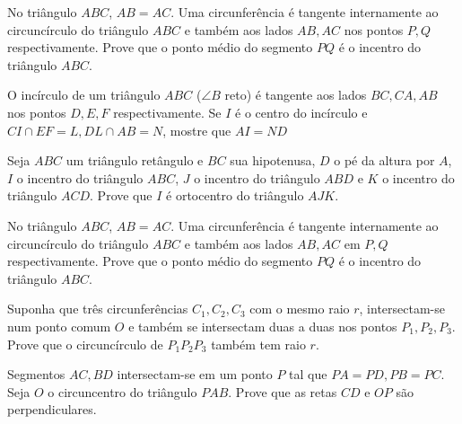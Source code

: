 \begin{questao}
  No triângulo $ABC$, $AB=AC$. Uma circunferência é
  tangente internamente ao circuncírculo do triângulo $ABC$ e também
  aos lados $AB,AC$ nos pontos $P,Q$ respectivamente. Prove que o
  ponto médio do segmento $PQ$ é o incentro do triângulo $ABC$.
\end{questao}

\begin{questao} O incírculo de um triângulo $ABC$ ($\angle B$ reto) é
  tangente aos lados $BC,CA,AB$ nos pontos $D,E,F$
  respectivamente. Se $I$ é o centro do incírculo e $CI \cap EF =
  L, DL \cap AB=N $, mostre que $AI=ND$
\end{questao}

\begin{questao} Seja $ABC$ um triângulo retângulo e $BC$ sua
  hipotenusa, $D$ o pé da altura por $A$, $I$ o incentro do
  triângulo $ABC$, $J$ o incentro do triângulo $ABD$ e $K$ o
  incentro do triângulo $ACD$. Prove que $I$ é ortocentro do
  triângulo $AJK$.
\end{questao}

\begin{questao} No triângulo $ABC$, $AB=AC$. Uma circunferência é
  tangente internamente ao circuncírculo do triângulo $ABC$ e também
  aos lados $AB,AC$ em $P,Q$ respectivamente. Prove que o ponto
  médio do segmento $PQ$ é o incentro do triângulo $ABC$.
\end{questao}

\begin{questao} Suponha que três circunferências $C_1,C_2,C_3$ com o
  mesmo raio $r$, intersectam-se num ponto comum $O$ e também se
  intersectam duas a duas nos pontos $P_1,P_2,P_3$. Prove que o
  circuncírculo de $P_1P_2P_3$ também tem raio $r$.
\end{questao}

\begin{questao} Segmentos $AC, BD$ intersectam-se em um ponto $P$ tal
  que $PA=PD, PB=PC$. Seja $O$ o circuncentro do triângulo
  $PAB$. Prove que as retas $CD$ e $OP$ são perpendiculares.
\end{questao}

